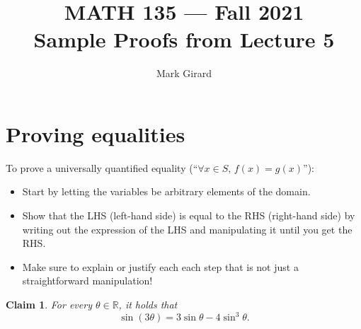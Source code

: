 \documentclass[11pt]{article}
\theoremstyle{plain}
\newtheorem*{claim}{Claim}
\theoremstyle{plain}
\theoremstyle{remark}
\def\reals{\mathbb{R}}
\begin{document}
\title{MATH 135 --- Fall 2021\\ Sample Proofs from Lecture 5}
\author{Mark Girard}

\maketitle

\section*{Proving equalities}

To prove a universally quantified equality (``$\forall x\in S,\, f(x)= g(x)$''):

\begin{itemize}
 \item Start by letting the variables be arbitrary elements of the domain.
 \item Show that the LHS (left-hand side) is equal to the RHS (right-hand side) by writing out the expression of the LHS and manipulating it until you get the RHS.
 \item Make sure to explain or justify each each step that is not just a straightforward manipulation!
\end{itemize}

\begin{tcolorbox}
\begin{claim}
 For every $\theta\in\reals$, it holds that
 \[
  \sin(3\theta) = 3\sin\theta - 4\sin^3\theta.
 \]
\end{claim}
\end{tcolorbox}
\end{document}
